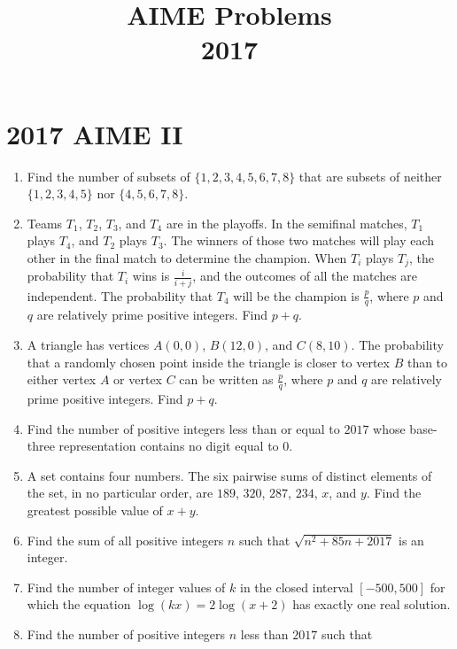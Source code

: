 \documentclass{article}
\title{AIME Problems \\ 2017}
\date{}
\begin{document}
\maketitle\thispagestyle{fancy}\newpage\section*{2017 AIME II}\begin{enumerate}[label=\arabic*., itemsep=0.5em]\item Find the number of subsets of \(\{1, 2, 3, 4, 5, 6, 7, 8\}\) that are subsets of neither \(\{1, 2, 3, 4, 5\}\) nor \(\{4, 5, 6, 7, 8\}\).\par \vspace{0.5em}\item Teams \(T_1\), \(T_2\), \(T_3\), and \(T_4\) are in the playoffs. In the semifinal matches, \(T_1\) plays \(T_4\), and \(T_2\) plays \(T_3\). The winners of those two matches will play each other in the final match to determine the champion. When \(T_i\) plays \(T_j\), the probability that \(T_i\) wins is \(\frac{i}{i+j}\), and the outcomes of all the matches are independent. The probability that \(T_4\) will be the champion is \(\frac{p}{q}\), where \(p\) and \(q\) are relatively prime positive integers. Find \(p+q\).\par \vspace{0.5em}\item A triangle has vertices \(A(0,0)\), \(B(12,0)\), and \(C(8,10)\). The probability that a randomly chosen point inside the triangle is closer to vertex \(B\) than to either vertex \(A\) or vertex \(C\) can be written as \(\frac{p}{q}\), where \(p\) and \(q\) are relatively prime positive integers. Find \(p+q\).\par \vspace{0.5em}\item Find the number of positive integers less than or equal to \(2017\) whose base-three representation contains no digit equal to \(0\).\par \vspace{0.5em}\item A set contains four numbers. The six pairwise sums of distinct elements of the set, in no particular order, are \(189\), \(320\), \(287\), \(234\), \(x\), and \(y\). Find the greatest possible value of \(x+y\).\par \vspace{0.5em}\item Find the sum of all positive integers \(n\) such that \(\sqrt{n^2+85n+2017}\) is an integer.\par \vspace{0.5em}\item Find the number of integer values of \(k\) in the closed interval \([-500,500]\) for which the equation \(\log(kx)=2\log(x+2)\) has exactly one real solution.\par \vspace{0.5em}\item Find the number of positive integers \(n\) less than \(2017\) such that 

\end{enumerate}
\end{document}
